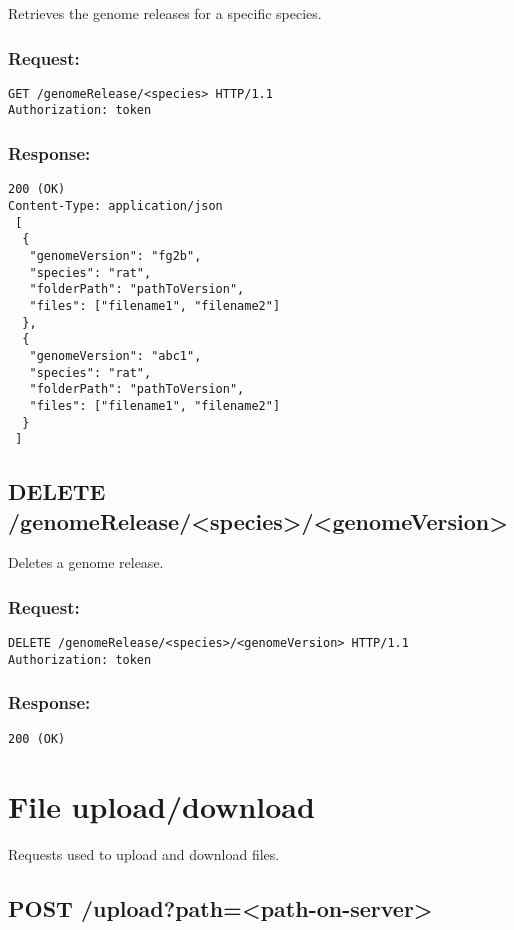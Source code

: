 Retrieves the genome releases for a specific species.

\subsubsection*{Request:}
\begin{verbatim}
GET /genomeRelease/<species> HTTP/1.1
Authorization: token
\end{verbatim}

\subsubsection*{Response:}
\begin{verbatim}
200 (OK)
Content-Type: application/json
 [
  {
   "genomeVersion": "fg2b",
   "species": "rat",
   "folderPath": "pathToVersion",
   "files": ["filename1", "filename2"]
  },
  {
   "genomeVersion": "abc1",
   "species": "rat",
   "folderPath": "pathToVersion",
   "files": ["filename1", "filename2"]
  }
 ]
\end{verbatim}

\subsection*{DELETE /genomeRelease/<species>/<genomeVersion>}

Deletes a genome release.

\subsubsection*{Request:}
\begin{verbatim}
DELETE /genomeRelease/<species>/<genomeVersion> HTTP/1.1
Authorization: token
\end{verbatim}

\subsubsection*{Response:}
\begin{verbatim}
200 (OK)
\end{verbatim}

\section*{File upload/download}

Requests used to upload and download files.

\subsection*{POST /upload?path=<path-on-server>}


